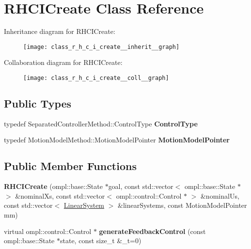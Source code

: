 \hypertarget{class_r_h_c_i_create}{\section{\-R\-H\-C\-I\-Create \-Class \-Reference}
\label{class_r_h_c_i_create}
}


\-Inheritance diagram for \-R\-H\-C\-I\-Create\-:\nopagebreak
\begin{figure}[H]
\begin{center}
\leavevmode
\texttt{[image: class\_r\_h\_c\_i\_create\_\_inherit\_\_graph]}
\end{center}
\end{figure}


\-Collaboration diagram for \-R\-H\-C\-I\-Create\-:\nopagebreak
\begin{figure}[H]
\begin{center}
\leavevmode
\texttt{[image: class\_r\_h\_c\_i\_create\_\_coll\_\_graph]}
\end{center}
\end{figure}
\subsection*{\-Public \-Types}
\begin{DoxyCompactItemize}
\item 
\hypertarget{class_r_h_c_i_create_a11c369848f9c90605af210dcbcfb0194}{typedef \*
\-Separated\-Controller\-Method\-::\-Control\-Type {\bfseries \-Control\-Type}}\label{class_r_h_c_i_create_a11c369848f9c90605af210dcbcfb0194}

\item 
\hypertarget{class_r_h_c_i_create_a662339ec07c14710db2903785224c183}{typedef \*
\-Motion\-Model\-Method\-::\-Motion\-Model\-Pointer {\bfseries \-Motion\-Model\-Pointer}}\label{class_r_h_c_i_create_a662339ec07c14710db2903785224c183}

\end{DoxyCompactItemize}
\subsection*{\-Public \-Member \-Functions}
\begin{DoxyCompactItemize}
\item 
\hypertarget{class_r_h_c_i_create_ae7a6a7c12aadfa3787c331658d257860}{{\bfseries \-R\-H\-C\-I\-Create} (ompl\-::base\-::\-State $\ast$goal, const std\-::vector$<$ ompl\-::base\-::\-State $\ast$ $>$ \&nominal\-Xs, const std\-::vector$<$ ompl\-::control\-::\-Control $\ast$ $>$ \&nominal\-Us, const std\-::vector$<$ \hyperlink{class_linear_system}{\-Linear\-System} $>$ \&linear\-Systems, const \-Motion\-Model\-Pointer mm)}\label{class_r_h_c_i_create_ae7a6a7c12aadfa3787c331658d257860}

\item 
\hypertarget{class_r_h_c_i_create_a098e194144edb28b252e97d78200f078}{virtual ompl\-::control\-::\-Control $\ast$ {\bfseries generate\-Feedback\-Control} (const ompl\-::base\-::\-State $\ast$state, const size\-\_\-t \&\-\_\-t=0)}\label{class_r_h_c_i_create_a098e194144edb28b252e97d78200f078}

\end{DoxyCompactItemize}

